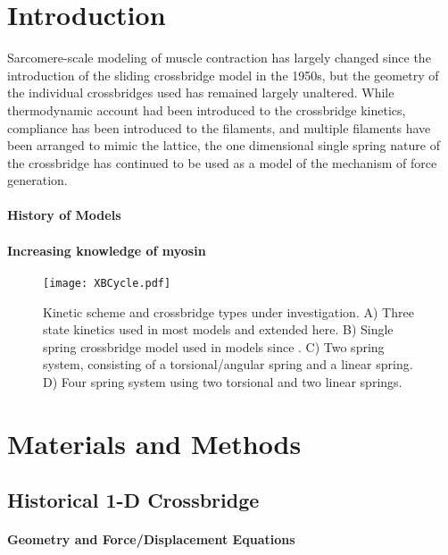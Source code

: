 \documentclass[11pt]{article}
\begin{document}
\begin{multicols}{2}



\section*{Introduction}

Sarcomere-scale modeling of muscle contraction has largely changed since the introduction of the sliding crossbridge model in the 1950s, but the geometry of the individual crossbridges used has remained largely unaltered. While thermodynamic account had been introduced to the crossbridge kinetics, compliance has been introduced to the filaments, and multiple filaments have been arranged to mimic the lattice, the one dimensional single spring nature of the crossbridge has continued to be used as a model of the mechanism of force generation.

\paragraph*{History of Models}

\paragraph*{Increasing knowledge of myosin}

\begin{figure}[H]
\begin{center}
\texttt{[image: XBCycle.pdf]}
\label{xbtypes}
\caption{{\small Kinetic scheme and crossbridge types under investigation. A) Three state kinetics used in most models and extended here. B) Single spring crossbridge model used in models since \cite{Huxley57}. C) Two spring system, consisting of a torsional/angular spring and a linear spring. D) Four spring system using two torsional and two linear springs.}}
\end{center}
\end{figure}


\section*{Materials and Methods}



\subsection*{Historical 1-D Crossbridge}
\paragraph*{Geometry and Force/Displacement Equations}


\end{multicols}
\end{document}
